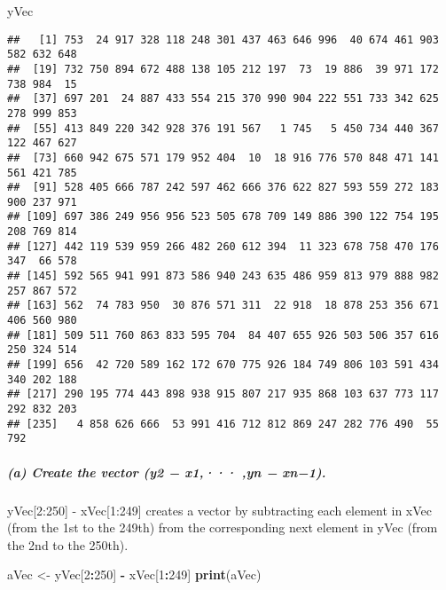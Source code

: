 \documentclass[
]{article}
\newenvironment{Shaded}{\begin{snugshade}}{\end{snugshade}}
\newcommand{\DecValTok}[1]{\textcolor[rgb]{0.00,0.00,0.81}{#1}}
\newcommand{\FunctionTok}[1]{\textcolor[rgb]{0.13,0.29,0.53}{\textbf{#1}}}
\newcommand{\NormalTok}[1]{#1}
\newcommand{\OtherTok}[1]{\textcolor[rgb]{0.56,0.35,0.01}{#1}}
\newcommand{\SpecialCharTok}[1]{\textcolor[rgb]{0.81,0.36,0.00}{\textbf{#1}}}
\begin{document}
\begin{Shaded}
\begin{Highlighting}[]
\NormalTok{ yVec}
\end{Highlighting}
\end{Shaded}

\begin{verbatim}
##   [1] 753  24 917 328 118 248 301 437 463 646 996  40 674 461 903 582 632 648
##  [19] 732 750 894 672 488 138 105 212 197  73  19 886  39 971 172 738 984  15
##  [37] 697 201  24 887 433 554 215 370 990 904 222 551 733 342 625 278 999 853
##  [55] 413 849 220 342 928 376 191 567   1 745   5 450 734 440 367 122 467 627
##  [73] 660 942 675 571 179 952 404  10  18 916 776 570 848 471 141 561 421 785
##  [91] 528 405 666 787 242 597 462 666 376 622 827 593 559 272 183 900 237 971
## [109] 697 386 249 956 956 523 505 678 709 149 886 390 122 754 195 208 769 814
## [127] 442 119 539 959 266 482 260 612 394  11 323 678 758 470 176 347  66 578
## [145] 592 565 941 991 873 586 940 243 635 486 959 813 979 888 982 257 867 572
## [163] 562  74 783 950  30 876 571 311  22 918  18 878 253 356 671 406 560 980
## [181] 509 511 760 863 833 595 704  84 407 655 926 503 506 357 616 250 324 514
## [199] 656  42 720 589 162 172 670 775 926 184 749 806 103 591 434 340 202 188
## [217] 290 195 774 443 898 938 915 807 217 935 868 103 637 773 117 292 832 203
## [235]   4 858 626 666  53 991 416 712 812 869 247 282 776 490  55 792
\end{verbatim}

\subparagraph{(a) Create the vector (y2 − x1,··· ,yn −
xn−1).}\label{a-create-the-vector-y2-x1-yn-xn1.}

yVec{[}2:250{]} - xVec{[}1:249{]} creates a vector by subtracting each
element in xVec (from the 1st to the 249th) from the corresponding next
element in yVec (from the 2nd to the 250th).

\begin{Shaded}
\begin{Highlighting}[]
\NormalTok{aVec }\OtherTok{\textless{}{-}}\NormalTok{ yVec[}\DecValTok{2}\SpecialCharTok{:}\DecValTok{250}\NormalTok{] }\SpecialCharTok{{-}}\NormalTok{ xVec[}\DecValTok{1}\SpecialCharTok{:}\DecValTok{249}\NormalTok{]}
\FunctionTok{print}\NormalTok{(aVec)}
\end{Highlighting}
\end{Shaded}
\end{document}
